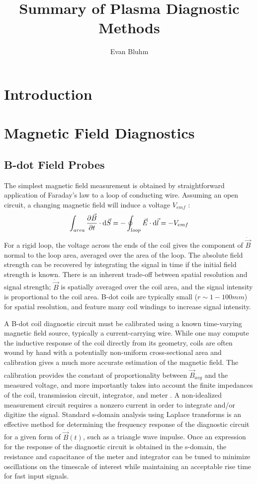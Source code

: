 \documentclass{jpp}
\title{Summary of Plasma Diagnostic Methods}
\author{Evan Bluhm}
\begin{document}
\maketitle

\section{Introduction}



\section{Magnetic Field Diagnostics}

\subsection{B-dot Field Probes}

The simplest magnetic field measurement is obtained by straightforward application of Faraday's law to a loop of conducting wire. Assuming an open circuit, a changing magnetic field will induce a voltage $V_{emf}$ :
\begin{equation*}
\int_{area} \pdv{\vec B}{t} \cdot \dd \vec S = - \oint _{loop} \vec E \cdot \dd \vec l = - V_{emf}
\end{equation*}
For a rigid loop, the voltage across the ends of the coil gives the component of $\dot{\vec B}$ normal to the loop area, averaged over the area of the loop. The absolute field strength can be recovered by integrating the signal in time if the initial field strength is known. There is an inherent trade-off between spatial resolution and signal strength; $\dot{\vec B}$ is spatially averaged over the coil area, and the signal intensity is proportional to the coil area. B-dot coils are typically small ($r \sim 1-100 mm$) for spatial resolution, and feature many coil windings to increase signal intensity.

A B-dot coil diagnostic circuit must be calibrated using a known time-varying magnetic field source, typically a current-carrying wire. While one may compute the inductive response of the coil directly from its geometry, coils are often wound by hand with a potentially non-uniform cross-sectional area and calibration gives a much more accurate estimation of the magnetic field. The calibration provides the constant of proportionality between $\dot {\vec B}_{avg}$ and the measured voltage, and more importantly takes into account the finite impedances of the coil, transmission circuit, integrator, and meter \citep{doi:10.1063/1.3246785}. A non-idealized measurement circuit requires a nonzero current in order to integrate and/or digitize the signal. Standard s-domain analysis using Laplace transforms is an effective method for determining the frequency response of the diagnostic circuit for a given form of $\dot{\vec B}(t)$, such as a triangle wave impulse. Once an expression for the response of the diagnostic circuit is obtained in the s-domain, the resistance and capacitance of the meter and integrator can be tuned to minimize oscillations on the timescale of interest while maintaining an acceptable rise time for fast input signals.
\end{document}
